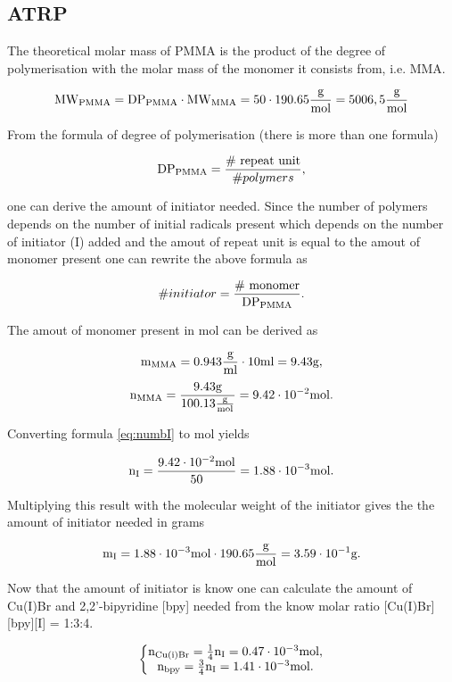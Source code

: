\subsection{ATRP}

    The theoretical molar mass of PMMA is the product of the degree of polymerisation
    with the molar mass of the monomer it consists from, i.e. MMA.
    
    $$\mathtext[PMMA]{MW} = \mathtext[PMMA]{DP} \cdot \mathtext[MMA]{MW} = 50 \cdot 190.65\MW =5006,5\MW$$

    From the formula of degree of polymerisation (there is more than one formula)

    \begin{equation}
        \mathtext[PMMA]{DP} = \frac{\text{\# repeat unit}}{\# polymers},
        \label{eq:DPpmma}
    \end{equation}

    one can derive the amount of initiator needed. Since the number of polymers depends
    on the number of initial radicals present which depends on the number of initiator (I) added
    and the amout of repeat unit is equal to the amout of monomer present one can rewrite the above formula as 

    \begin{equation}
        \# initiator = \frac{\text{\# monomer}}{\mathtext[PMMA]{DP}}.
        \label{eq:numbI}
    \end{equation}

    The amout of monomer present in mol can be derived as

    $$\mathtext[MMA]{m} = 0.943\density\cdot 10\ml = 9.43\g,$$
    $$\mathtext[MMA]{n} = \frac{9.43\g}{100.13\MW} = 9.42\cdot10^{-2}\mole.$$

    Converting formula \ref{eq:numbI} to mol yields

    $$\mathtext[I]{n} = \frac{9.42\cdot10^{-2}\mole}{50}=1.88\cdot10^{-3}\mole.$$

    Multiplying this result with the molecular weight of the initiator gives the
    the amount of initiator needed in grams

    $$\mathtext[I]{m} = 1.88\cdot10^{-3}\mole \cdot 190.65\MW = 3.59\cdot10^{-1}\g.$$

    Now that the amount of initiator is know one can calculate the amount of Cu(I)Br and 
    2,2'-bipyridine [bpy] needed from the know molar ratio [Cu(I)Br][bpy][I] = 1:3:4.

    $$\left\{\begin{matrix}
        \mathtext[Cu(i)Br]{n} = \frac{1}{4}\mathtext[I]{n} = 0.47\cdot10^{-3}\mole,\\
        \mathtext[bpy]{n} = \frac{3}{4}\mathtext[I]{n} = 1.41\cdot10^{-3}\mole.\\
    \end{matrix}\right.$$

